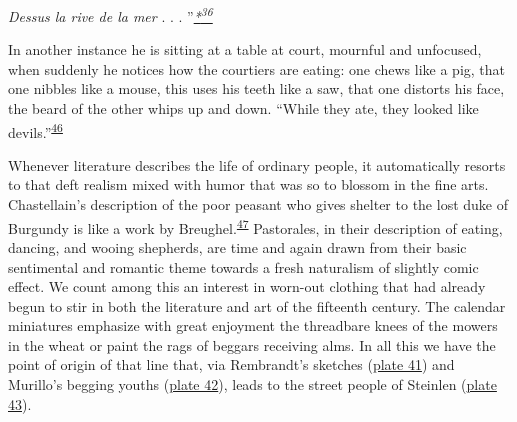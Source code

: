 \emph{Dessus la rive de la mer} . . .
''\emph{\protect\hypertarget{21_Chapter_Thirteen__IMAGE_AND_WORD.xhtmlux5cux23id_2365}{\protect\hyperlink{23_NOTES.xhtmlux5cux23id_2366}{*\textsuperscript{36}}}}

In another instance he is sitting at a table at court, mournful and
unfocused, when suddenly he notices how the courtiers are eating: one
chews like a pig, that one nibbles like a mouse, this uses his teeth
like a saw, that one distorts his face, the beard of the other whips up
and down. ``While they ate, they looked like
devils.''\textsuperscript{\protect\hypertarget{21_Chapter_Thirteen__IMAGE_AND_WORD.xhtmlux5cux23id_219}{\protect\hyperlink{23_NOTES.xhtmlux5cux23id_220}{46}}}

Whenever literature describes the life of ordinary people, it
automatically resorts to that deft realism mixed with humor that was so
to blossom in the fine arts. Chastellain's description of the poor
peasant who gives shelter to the lost duke of Burgundy is like a work by
Breughel.\textsuperscript{\protect\hypertarget{21_Chapter_Thirteen__IMAGE_AND_WORD.xhtmlux5cux23id_217}{\protect\hyperlink{23_NOTES.xhtmlux5cux23id_218}{47}}}
Pastorales, in their description of eating, dancing, and wooing
shepherds, are time and again drawn from their basic sentimental and
romantic theme towards a fresh naturalism of slightly comic effect. We
count among this an interest in worn-out clothing that had already begun
to stir in both the literature and art of the fifteenth century. The
calendar miniatures emphasize with great enjoyment the threadbare knees
of the mowers in the wheat
\protect\hypertarget{21_Chapter_Thirteen__IMAGE_AND_WORD.xhtmlux5cux23page_365}{}{}or
paint the rags of beggars receiving alms. In all this we have the point
of origin of that line that, via Rembrandt's sketches
(\protect\hyperlink{20_ILLUSTRATIONS_FOLLOW_PAGE.xhtmlux5cux23id_36}{plate
41}) and Murillo's begging youths
(\protect\hyperlink{20_ILLUSTRATIONS_FOLLOW_PAGE.xhtmlux5cux23id_37}{plate
42}), leads to the street people of Steinlen
(\protect\hyperlink{20_ILLUSTRATIONS_FOLLOW_PAGE.xhtmlux5cux23id_38}{plate
43}).

